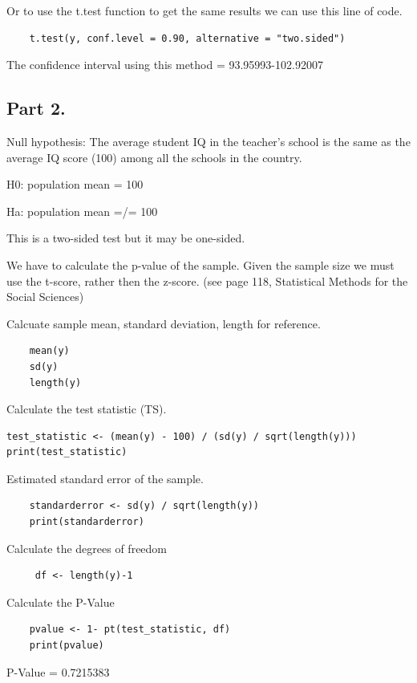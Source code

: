 \documentclass[12pt,letterpaper]{article}
\begin{document}
	Or to use the t.test function to get the same results we can use this line of code.
	\begin{verbatim}
	t.test(y, conf.level = 0.90, alternative = "two.sided")
    \end{verbatim}
The confidence interval using this method = 93.95993-102.92007
\vspace{10mm}

\subsection*{Part 2.}

Null hypothesis: The average student IQ in the teacher's school is the same as the average IQ score (100) among all the schools in the country.
\vspace{5mm}

H0: population mean = 100
\vspace{1mm}

Ha: population mean =/= 100
\vspace{1mm}

This is a two-sided test but it may be one-sided.
\vspace{5mm}

We have to calculate the p-value of the sample. Given the sample size we must use the t-score, rather then the z-score. (see page 118, Statistical Methods for the Social Sciences)
\vspace{5mm}

Calcuate sample mean, standard deviation, length for reference.
\begin{verbatim}
	mean(y)
	sd(y)
	length(y)
\end{verbatim}

Calculate the test statistic (TS).
\begin{Verbatim}
test_statistic <- (mean(y) - 100) / (sd(y) / sqrt(length(y)))
print(test_statistic)
\end{Verbatim}
Estimated standard error of the sample.
\begin{Verbatim}
	standarderror <- sd(y) / sqrt(length(y))
	print(standarderror)
\end{Verbatim}
Calculate the degrees of freedom
\begin{Verbatim}
     df <- length(y)-1
\end{Verbatim}
Calculate the P-Value
\begin{Verbatim}
	pvalue <- 1- pt(test_statistic, df)
	print(pvalue)
\end{Verbatim}
P-Value = 0.7215383
\end{document}
